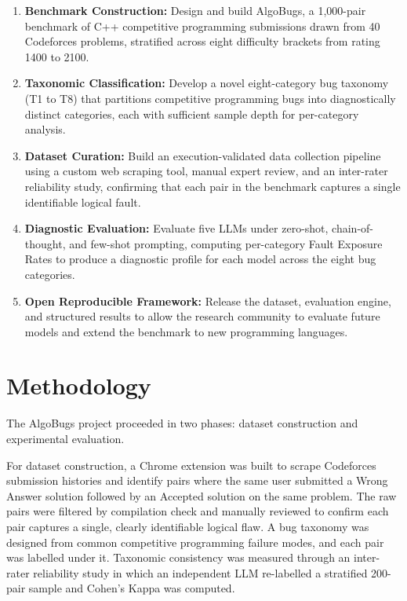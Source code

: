 \begin{enumerate}
    \item \textbf{Benchmark Construction:} Design and build AlgoBugs, a 1,000-pair benchmark of C++ competitive programming submissions drawn from 40 Codeforces problems, stratified across eight difficulty brackets from rating 1400 to 2100.

    \item \textbf{Taxonomic Classification:} Develop a novel eight-category bug taxonomy (T1 to T8) that partitions competitive programming bugs into diagnostically distinct categories, each with sufficient sample depth for per-category analysis.

    \item \textbf{Dataset Curation:} Build an execution-validated data collection pipeline using a custom web scraping tool, manual expert review, and an inter-rater reliability study, confirming that each pair in the benchmark captures a single identifiable logical fault.

    \item \textbf{Diagnostic Evaluation:} Evaluate five LLMs under zero-shot, chain-of-thought, and few-shot prompting, computing per-category Fault Exposure Rates to produce a diagnostic profile for each model across the eight bug categories.

    \item \textbf{Open Reproducible Framework:} Release the dataset, evaluation engine, and structured results to allow the research community to evaluate future models and extend the benchmark to new programming languages.
\end{enumerate}

\section{Methodology}

The AlgoBugs project proceeded in two phases: dataset construction and experimental evaluation.

For dataset construction, a Chrome extension was built to scrape Codeforces submission histories and identify pairs where the same user submitted a Wrong Answer solution followed by an Accepted solution on the same problem. The raw pairs were filtered by compilation check and manually reviewed to confirm each pair captures a single, clearly identifiable logical flaw. A bug taxonomy was designed from common competitive programming failure modes, and each pair was labelled under it. Taxonomic consistency was measured through an inter-rater reliability study in which an independent LLM re-labelled a stratified 200-pair sample and Cohen's Kappa was computed.

